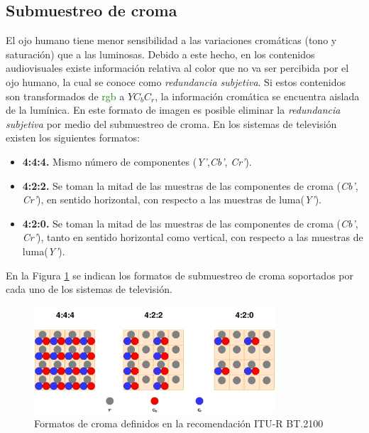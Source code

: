 \documentclass[a4paper, 12pt]{report}
\begin{document}
\subsection{Submuestreo de croma}
\label{subsec:croma_sub}

El ojo humano tiene menor sensibilidad a las variaciones cromáticas (tono y saturación) que a las luminosas. Debido a este hecho, en los contenidos audiovisuales existe información relativa al color que no va ser percibida por el ojo humano, la cual se conoce como \textit{redundancia subjetiva}.
Si estos contenidos son transformados de \textcolor{green}{rgb} a $YC_{b}C_{r}$, la información cromática se encuentra aislada de la lumínica. En este formato de imagen es posible eliminar la \textit{redundancia subjetiva} por medio del submuestreo de croma. En los sistemas de televisión existen los siguientes formatos:
\begin{itemize}
    \item \textbf{4:4:4.} Mismo número de componentes (\textit{Y'},\textit{Cb'}, \textit{Cr'}).
    \item \textbf{4:2:2.} Se toman la mitad de las muestras de las componentes  de croma (\textit{Cb'}, \textit{Cr'}), en sentido  horizontal, con respecto a las muestras de luma(\textit{Y'}).
    \item \textbf{4:2:0.} Se toman la mitad de las muestras de las componentes  de croma (\textit{Cb'}, \textit{Cr'}), tanto en sentido  horizontal como vertical, con respecto a las muestras de luma(\textit{Y'}).
\end{itemize}
En la Figura \ref{fig:chroma_sub} se indican los formatos de submuestreo de croma soportados por cada uno de los sistemas de televisión.
\begin{figure}[H]
    \centering
    \includegraphics[width=9cm, keepaspectratio]{img/3_Fundamentos_de_Television/3_1_Formatos_de_TV_Tradicionales/3_1_4_Submuestreo_de_Croma/1_chroma_subsampling.png}
    \caption{Formatos de croma definidos en la recomendación ITU-R BT.2100}
    \label{fig:chroma_sub}
\end{figure}
\end{document}
